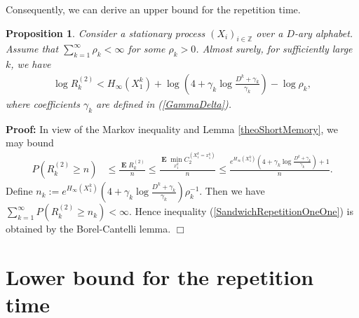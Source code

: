 \documentclass[a4paper,12pt]{article}
\newcommand{\okra}[1]{\left( #1 \right)}
\DeclareMathOperator{\mean}{\mathbf{E}}
\newtheorem{proposition}{Proposition}
\newenvironment*{proof}{\begin{trivlist}\item[]
\noindent\textbf{Proof:}}{$\Box$\par\end{trivlist}}
\begin{document}
Consequently, we can derive an upper bound for the repetition time.
\begin{proposition}
  \label{theoSandwichRepetitionOneOne}
  Consider a stationary process $(X_i)_{i\in\mathbb{Z}}$ over a
  $D$-ary alphabet.  Assume that $\sum_{k=1}^\infty \rho_k<\infty$ for
  some $\rho_k>0$.  Almost surely, for sufficiently large $k$, we have
  \begin{align}
    \label{SandwichRepetitionOneOne}
    \log R^{(2)}_k<H_\infty(X_1^k)+\log
    \okra{4+\gamma_k\log\frac{D^k+\gamma_k}{\gamma_k}}
    -\log\rho_k
    ,
  \end{align}
  where coefficients $\gamma_k$ are defined in (\ref{GammaDelta}).
\end{proposition}
\begin{proof}
  In view of the Markov inequality and Lemma \ref{theoShortMemory},
  we may bound
  \begin{align}
    P(R^{(2)}_k\ge n)
    &\le \frac{\mean R^{(2)}_k}{n}
      \le \frac{\mean \min_{x_1^k} C^{(X_1^k=x_1^k)}_2}{n}
       \le \frac{e^{H_\infty(X_1^k)}
      \okra{4+\gamma_k\log\frac{D^k+\gamma_k}{\gamma_k}}+1}{n}.
  \end{align}
  Define
  $n_k:=e^{H_\infty(X_1^k)}
  \okra{4+\gamma_k\log\frac{D^k+\gamma_k}{\gamma_k}}\rho_k^{-1}$. Then
  we have $\sum_{k=1}^\infty P(R^{(2)}_k\ge n_k)<\infty$. Hence
  inequality (\ref{SandwichRepetitionOneOne}) is obtained by the
  Borel-Cantelli lemma.
\end{proof}

\section{Lower bound for the repetition time}
\label{secYetAnother}
\end{document}
